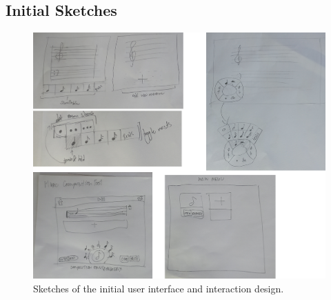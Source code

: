 		\subsection{Initial Sketches}

			\begin{figure}[H]
				\centering
				\includegraphics[scale=0.3]{figures/initial_sketches.png}
			    \caption{Sketches of the initial user interface and interaction design.}
			    \label{fig:initial_sketches}
			\end{figure}


